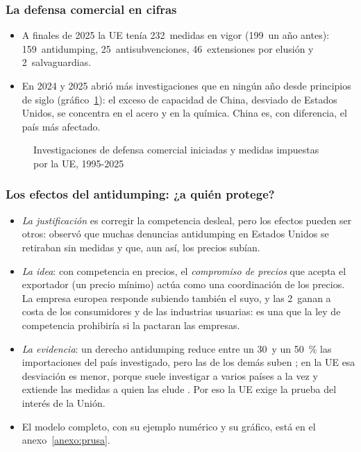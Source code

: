 \documentclass[11pt]{article}
\begin{document}
\subsubsection{La defensa comercial en cifras}\label{sec:defensa-cifras}

\begin{itemize}
\item A finales de 2025 la UE tenía 232~medidas en vigor (199~un año antes): 159~antidumping, 25~antisubvenciones, 46~extensiones por elusión y 2~salvaguardias\nocite{CE2026DefensaComercial}.
\item En 2024 y 2025 abrió más investigaciones que en ningún año desde principios de siglo (gráfico~\ref{fig:defensa}): el exceso de capacidad de China, desviado de Estados Unidos, se concentra en el acero y en la química. China es, con diferencia, el país más afectado.
\end{itemize}

\begin{figure}[H]
\centering
\caption{Investigaciones de defensa comercial iniciadas y medidas impuestas por la UE, 1995-2025}\label{fig:defensa}
\end{figure}

\subsubsection{Los efectos del antidumping: ¿a quién protege?}\label{sec:prusa}

\begin{itemize}
\item \emph{La justificación} es corregir la competencia desleal, pero los efectos pueden ser otros: \textcite{Prusa1992Withdrawn} observó que muchas denuncias antidumping en Estados Unidos se retiraban sin medidas y que, aun así, los precios subían.
\item \emph{La idea}: con competencia en precios, el \emph{compromiso de precios} que acepta el exportador (un precio mínimo) actúa como una coordinación de los precios. La empresa europea responde subiendo también el suyo, y las 2~ganan a costa de los consumidores y de las industrias usuarias: es una  que la ley de competencia prohibiría si la pactaran las empresas.
\item \emph{La evidencia}: un derecho antidumping reduce entre un 30~y un 50~\% las importaciones del país investigado, pero las de los demás suben \parencite{Prusa2001Spread}; en la UE esa desviación es menor, porque suele investigar a varios países a la vez y extiende las medidas a quien las elude \parencite{KoningsVandenbussche2001Diversion}. Por eso la UE exige la prueba del interés de la Unión.
\item El modelo completo, con su ejemplo numérico y su gráfico, está en el anexo~\ref{anexo:prusa}.
\end{itemize}
\end{document}

